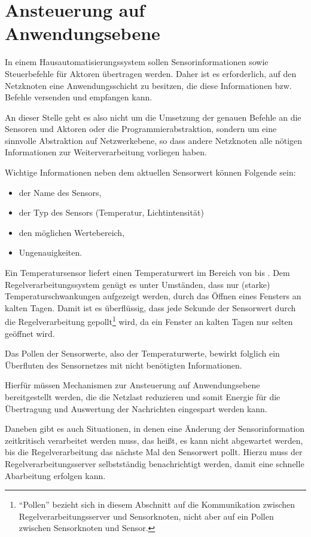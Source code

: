 \section{Ansteuerung auf Anwendungsebene}
\label{sec:coap}

	In einem Hausautomatisierungssystem sollen Sensorinformationen
	sowie Steuerbefehle für Aktoren übertragen werden.
	Daher ist es erforderlich, auf den Netzknoten eine Anwendungsschicht
	zu besitzen, die diese Informationen bzw. Befehle
	versenden und empfangen kann.

	An dieser Stelle geht es also nicht um die Umsetzung der genauen Befehle an
	die Sensoren und Aktoren oder die Programmierabstraktion,
	sondern um eine sinnvolle Abstraktion auf Netzwerkebene,
	so dass andere Netzknoten alle nötigen Informationen zur
	Weiterverarbeitung vorliegen haben.

	Wichtige Informationen neben dem aktuellen Sensorwert
	können Folgende sein:
	\begin{itemize}
	\item 	der Name des Sensors,
	\item 	der Typ des Sensors (\zB Temperatur, Lichtintensität)
	\item 	den möglichen Wertebereich,
	\item 	Ungenauigkeiten.
	\end{itemize}

	Ein Temperatursensor liefert einen Temperaturwert im Bereich
	von  bis .
	Dem Regelverarbeitungssystem genügt es unter Umständen,
	dass nur (starke) Temperaturschwankungen aufgezeigt werden,
	\zB durch das Öffnen eines Fensters an kalten Tagen.
	Damit ist es überflüssig, dass jede Sekunde der Sensorwert
	durch die Regelverarbeitung gepollt\footnote{\enquote{Pollen} bezieht sich
		in diesem Abschnitt auf die Kommunikation zwischen
		Regelverarbeitungsserver und Sensorknoten, nicht aber auf ein
		Pollen zwischen Sensorknoten und Sensor.}
	wird, da ein Fenster
	an kalten Tagen nur selten geöffnet wird.

	Das Pollen der Sensorwerte, also der Temperaturwerte,
	bewirkt folglich ein Überfluten des Sensornetzes
	mit \iA nicht benötigten Informationen.

	Hierfür müssen Mechanismen zur Ansteuerung auf Anwendungsebene
	bereitgestellt werden, die die Netzlast reduzieren und somit Energie
	für die Übertragung und Auswertung der Nachrichten eingespart werden
	kann.

	Daneben gibt es auch Situationen, in denen eine Änderung der
	Sensorinformation zeitkritisch verarbeitet werden muss,
	das heißt, es kann nicht abgewartet werden, bis die Regelverarbeitung
	das nächste Mal den Sensorwert pollt.
	Hierzu muss der Regelverarbeitungsserver selbstständig
	benachrichtigt werden, damit eine schnelle Abarbeitung erfolgen kann.

